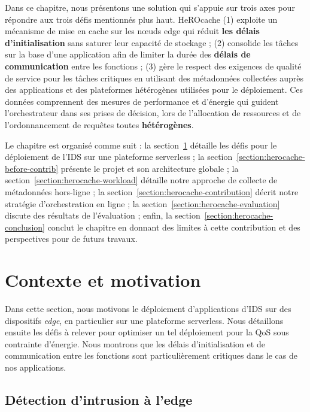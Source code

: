 Dans ce chapitre, nous présentons une solution qui s'appuie sur trois axes pour répondre aux trois défis mentionnés plus haut. HeROcache (1) exploite un mécanisme de mise en cache sur les nœuds edge qui réduit \textbf{les délais d'initialisation} sans saturer leur capacité de stockage ; (2) consolide les tâches sur la base d'une application afin de limiter la durée des \textbf{délais de communication} entre les fonctions ; (3) gère le respect des exigences de qualité de service pour les tâches critiques en utilisant des métadonnées collectées auprès des applications et des plateformes hétérogènes utilisées pour le déploiement. Ces données comprennent des mesures de performance et d'énergie qui guident l'orchestrateur dans ses prises de décision, lors de l'allocation de ressources et de l'ordonnancement de requêtes toutes \textbf{hétérogènes}.

Le chapitre est organisé comme suit : la section~\ref{section:herocache-background} détaille les défis pour le déploiement de l'\gls{IDS} sur une plateforme serverless ; la section~\ref{section:herocache-before-contrib} présente le projet et son architecture globale ; la section~\ref{section:herocache-workload} détaille notre approche de collecte de métadonnées hors-ligne ; la section~\ref{section:herocache-contribution} décrit notre stratégie d'orchestration en ligne ; la section~\ref{section:herocache-evaluation} discute des résultats de l'évaluation ; enfin, la section~\ref{section:herocache-conclusion} conclut le chapitre en donnant des limites à cette contribution et des perspectives pour de futurs travaux.

\section{Contexte et motivation}
\label{section:herocache-background}

Dans cette section, nous motivons le déploiement d'applications d'\gls{IDS} sur des dispositifs \textit{edge}, en particulier sur une plateforme serverless. Nous détaillons ensuite les défis à relever pour optimiser un tel déploiement pour la \gls{QoS} sous contrainte d'énergie. Nous montrons que les délais d'initialisation et de communication entre les fonctions sont particulièrement critiques dans le cas de nos applications.

\subsection{Détection d'intrusion à l'edge}

